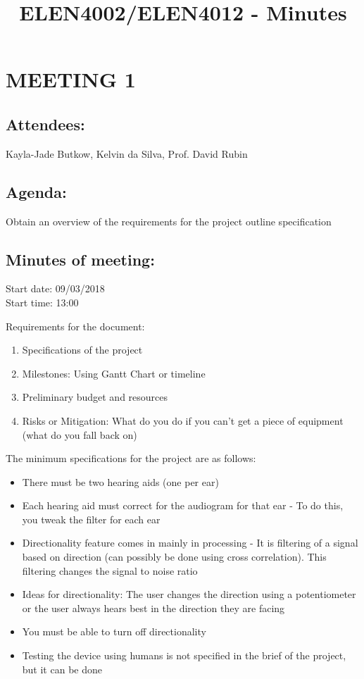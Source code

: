 \documentclass[10pt,onecolumn]{witseiepaper}
\title{ELEN4002/ELEN4012 - Minutes}
\begin{document}
\maketitle
\pagestyle{plain}
\setcounter{page}{1}

\section*{MEETING 1}
\subsection*{Attendees:}
Kayla-Jade Butkow, Kelvin da Silva, Prof. David Rubin
\subsection*{Agenda:} 
Obtain an overview of the requirements for the project outline specification

\subsection*{Minutes of meeting:}
Start date: 09/03/2018 \\
Start time: 13:00

Requirements for the document:
\begin{enumerate}
	\item Specifications of the project
	\item Milestones: Using Gantt Chart or timeline
	\item Preliminary budget and resources 
	\item Risks or Mitigation: What do you do if you can't get a piece of equipment (what do you fall back on)
\end{enumerate}

The minimum specifications for the project are as follows: 
\begin{itemize}
	\item There must be two hearing aids (one per ear)
	\item Each hearing aid must correct for the audiogram for that ear - To do this, you tweak the filter for each ear
	\item Directionality feature comes in mainly in processing - It is filtering of a signal based on direction (can possibly be done using cross correlation). This filtering changes the signal to noise ratio 
	\item Ideas for directionality: The user changes the direction using a potentiometer or the user always hears best in the direction they are facing
	\item You must be able to turn off directionality 
	\item Testing the device using humans is not specified in the brief of the project, but it can be done 
\end{itemize}
\end{document}
